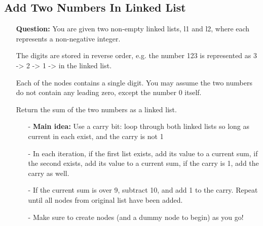 \documentclass[12pt]{article}
\begin{document}
\subsection{Add Two Numbers In Linked List}
\begin{enumerate}
  \item[] \textbf{Question:} You are given two non-empty linked lists, l1 and l2, where each represents a non-negative integer.

The digits are stored in reverse order, e.g. the number 123 is represented as 3 -> 2 -> 1 -> in the linked list.

Each of the nodes contains a single digit. You may assume the two numbers do not contain any leading zero, except the number 0 itself.

Return the sum of the two numbers as a linked list.


    \begin{enumerate}
      \item[-] \textbf{Main idea:} Use a carry bit: loop through both linked lists so long as current in each exist, and the carry is not 1
      \item[-] In each iteration, if the first list exists, add its value to a current sum, if the second exists, add its value to a current sum, if the carry is 1, add the carry as well.
      \item[-] If the current sum is over 9, subtract 10, and add 1 to the carry. Repeat until all nodes from original list have been added.
      \item[-] Make sure to create nodes (and a dummy node to begin) as you go!

    \end{enumerate}
\end{enumerate}
\end{document}

